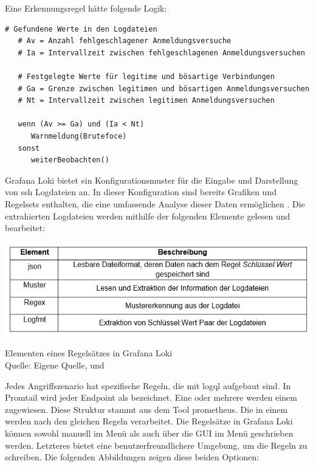 Eine Erkennungsregel hätte folgende Logik:
{
\begin{Verbatim}[frame=single]
   # Gefundene Werte in den Logdateien
   # Av = Anzahl fehlgeschlagener Anmeldungsversuche
   # Ia = Intervallzeit zwischen fehlgeschlagenen Anmeldungsversuchen

   # Festgelegte Werte für legitime und bösartige Verbindungen
   # Ga = Grenze zwischen legitimen und bösartigen Anmeldungsversuchen
   # Nt = Intervallzeit zwischen legitimen Anmeldungsversuchen

   wenn (Av >= Ga) und (Ia < Nt)
      Warnmeldung(Brutefoce)
   sonst
      weiterBeobachten()
\end{Verbatim}
}

\newpage
Grafana Loki bietet ein Konfigurationsmuster für die Eingabe und Darstellung von \gls{ssh} Logdateien an. In dieser Konfiguration sind bereits Grafiken und Regelsets enthalten, die eine umfassende Analyse dieser Daten ermöglichen \citep{VoidQuark_sshlogs}. Die extrahierten Logdateien werden mithilfe der folgenden Elemente gelesen und bearbeitet:

\begin{table}[H]
   \includegraphics[width=\linewidth]{assets/tabelle_sshgrafana.png}
   \caption[Elementen eines Regelsätzes in Grafana Loki]
   {Elementen eines Regelsätzes in Grafana Loki \\Quelle: Eigene Quelle, \citep{VoidQuark_sshlogs} und \citep{Setter_Logfmt}}
\end{table}

Jedes Angriffszenario hat spezifische Regeln, die mit \gls{logql} aufgebaut sind. In Promtail wird jeder \gls{Endpoint} als  bezeichnet. Eine oder mehrere  werden einem  zugewiesen. Diese Struktur stammt aus dem Tool \gls{prometheus}. Die  in einem  werden nach den gleichen Regeln verarbeitet. Die Regelsätze in Grafana Loki können sowohl manuell im Menü  als auch über die \gls{GUI} im Menü  geschrieben werden. Letzteres bietet eine benutzerfreundlichere Umgebung, um die Regeln zu schreiben. Die folgenden Abbildungen zeigen diese beiden Optionen:

